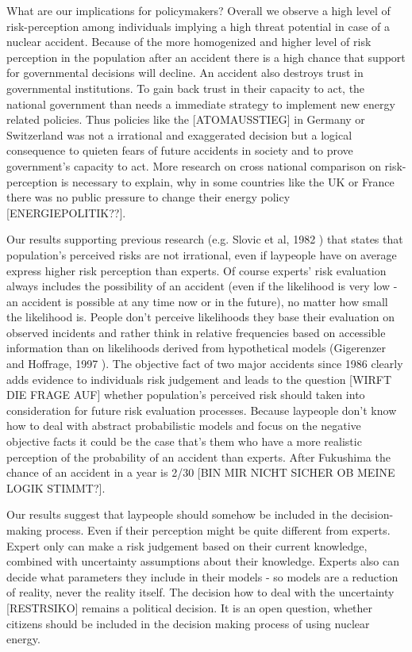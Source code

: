 What are our implications for policymakers? Overall we observe a high level of risk-perception among individuals implying a high threat potential in case of a nuclear accident. Because of the more homogenized and higher level of risk perception in the population after an accident there is a high chance that support for governmental decisions will decline. An accident also destroys trust in governmental institutions. To gain back  trust in their capacity to act, the national government than needs a immediate strategy to implement new energy related policies. Thus policies like the [ATOMAUSSTIEG] in Germany or Switzerland was not a irrational and exaggerated decision but a logical consequence to quieten fears of future accidents in society and to prove government's capacity to act. More research on cross national comparison on risk-perception is necessary to explain, why in some countries like the UK or France there was no public pressure to change their energy policy [ENERGIEPOLITIK??].



Our results supporting previous research (e.g. Slovic et al, 1982 \citep{Slovic:1982vr}) that states that population's perceived risks are not irrational, even if laypeople have on average express higher risk perception than experts. Of course experts' risk evaluation always includes the possibility of an accident (even if the likelihood is very low - an accident is possible at any time now or in the future), no matter how small the likelihood is. People don't perceive likelihoods they base their evaluation on observed incidents and rather think in relative frequencies based on accessible information than on likelihoods derived from hypothetical models (Gigerenzer and Hoffrage, 1997   \citep{gigerenzer_how_1995}). The objective fact of two major accidents since 1986 clearly adds evidence to individuals risk judgement and leads to the question [WIRFT DIE FRAGE AUF] whether population's perceived risk should taken into consideration for future risk evaluation processes.  Because laypeople don't know how to deal with abstract probabilistic models and focus on the negative objective facts it could be the case that's them who have a more realistic perception of the probability of an accident than experts. After Fukushima the chance of an accident in a year is 2/30 [BIN MIR NICHT SICHER OB MEINE LOGIK STIMMT?].  
 

Our results suggest that laypeople should somehow be included in the decision-making process. Even if their perception might be quite different from experts. Expert only can make a risk judgement based on their current knowledge, combined with uncertainty assumptions about their knowledge. Experts also can decide what parameters they include in their models - so models are a reduction of reality, never the reality itself. The decision how to deal with the uncertainty [RESTRSIKO]  remains a political decision. It is an open question, whether citizens should be included in the decision making process of using nuclear energy. 

